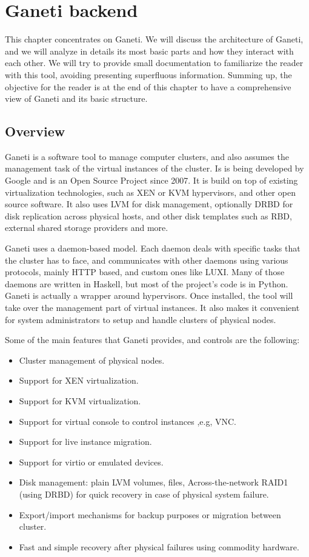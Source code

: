 \chapter{Ganeti backend}\label{ch:ganeti}

This chapter concentrates on Ganeti. We will discuss the architecture of Ganeti,
and we will analyze in details its most basic parts and how they interact with
each other. We will try to provide small documentation to familiarize the reader
with this tool, avoiding presenting superfluous information. Summing up, the
objective for the reader is at the end of this chapter to have a comprehensive
view of Ganeti and its basic structure.

\section{Overview}

Ganeti is a software tool to manage computer clusters, and also assumes the
management task of the virtual instances of the cluster. Is is being
developed by Google and is an Open Source Project since 2007. It is build on top
of existing virtualization technologies, such as XEN or KVM hypervisors, and
other open source software. It also uses LVM for disk management, optionally
DRBD for disk replication across physical hosts, and other disk templates such
as RBD, external shared storage providers and more.

Ganeti uses a daemon-based model. Each daemon deals with specific tasks that the
cluster has to face, and communicates with other daemons using various
protocols, mainly HTTP based, and custom ones like LUXI. Many of those daemons
are written in Haskell, but most of the project's code is in Python. Ganeti is
actually a wrapper around hypervisors. Once installed, the tool will take over
the management part of virtual instances. It also makes it convenient for system
administrators to setup and handle clusters of physical nodes.

Some of the main features that Ganeti provides, and controls are the following:

\begin{itemize}
  \item Cluster management of physical nodes.
  \item Support for XEN virtualization.
  \item Support for KVM virtualization.
  \item Support for virtual console to control instances ,e.g, VNC.
  \item Support for live instance migration.
  \item Support for virtio or emulated devices.
  \item Disk management: plain LVM volumes, files, Across-the-network RAID1
        (using DRBD) for quick recovery in case of physical system failure.
  \item Export/import mechanisms for backup purposes or migration between
        cluster.
  \item Fast and simple recovery after physical failures using commodity
        hardware.
\end{itemize}


